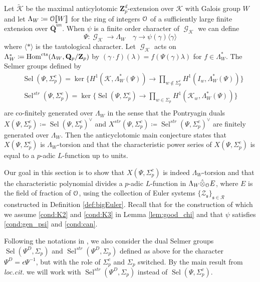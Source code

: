 \documentclass[leqno]{amsart}
\theoremstyle{definition}
\theoremstyle{remark}
\newcommand{\eo}{\EuScript{O}}
\newcommand{\Q}{{\mathbf{Q}}}
\newcommand{\Z}{{\mathbf{Z}}}
\newcommand{\Qp}{\mathbf{Q}_p}
\newcommand{\Zp}{\mathbf{Z}_p}
\DeclareMathOperator{\Hom}{Hom}
\DeclareMathOperator{\Gal}{\mathcal{G}}
\newcommand{\cts}{\textnormal{cts}}
\newcommand{\fs}{\mathfrak{s}}
\newcommand{\K}{{\mathcal{K}}} %
\DeclareMathOperator{\Sel}{Sel}
\begin{document}
Let $\tilde{\K}$ be the maximal anticylotomic $\Z_p^d$-extension
over $\K$ with Galois group $W$ 
and let $\Lambda_W\coloneqq\eo\llbracket W\rrbracket$
for the ring of integers $\eo$ of a sufficiently large
finite extension over $\bar{\Q}^{un}$.
When $\psi$ is a finite order character of $\Gal_\K$ we can define
\[
\Psi\colon \Gal_\K\to \Lambda_W\quad \gamma\to \psi(\gamma)
\langle \gamma\rangle
\]
where $\langle*\rangle$ is the tautological character.
Let $\Gal_\K$ acts on $\Lambda_W^*\coloneqq
\Hom^{\cts}(\Lambda_W,\Qp/\Zp)$ by
$(\gamma\cdot f)(\lambda)=f(\Psi(\gamma)\lambda)$
for $f\in \Lambda_W^*$.
The Selmer groups defined by
\begin{equation}\label{def:Selmers}
\begin{aligned}
    &\Sel(\Psi,\Sigma_p^c)=
    \ker\big\{
    H^1(\K,\Lambda_W^*(\Psi))\to 
    \prod_{w\notin \Sigma_p^c}
    H^1(I_w,\Lambda_W^*(\Psi))
    \big\}\\
    &\Sel^{str}(\Psi,\Sigma_p^c)=
    \ker\big\{
    \Sel(\Psi,\Sigma_p^c)\to
    \prod_{w\in \Sigma_p}
    H^1(\K_w,\Lambda_W^*(\Psi))
    \big\}\\
\end{aligned}
\end{equation}
are co-finitely generated over $\Lambda_W$
in the sense that the Pontryagin duals 
$X(\Psi,\Sigma_p^c)\coloneqq  \Sel(\Psi,\Sigma_p^c)^\vee$ and
$X^{str}(\Psi,\Sigma_p^c)\coloneqq  \Sel^{str}(\Psi,\Sigma_p^c)^\vee$ 
are finitely generated over $\Lambda_W$.
Then the anticyclotomic main conjecture
states that $X(\Psi,\Sigma^c_p)$ is $\Lambda_W$-torsion and
that the characteristic power series
of $X(\Psi,\Sigma^c_p)$ 
is equal to a $p$-adic $L$-function up to units.

Our goal in this section is to show that 
$X(\Psi,\Sigma_p^c)$ is indeed $\Lambda_W$-torsion
and that the characteristic polynomial divides
a $p$-adic $L$-function in 
$\Lambda_W\hat{\otimes}_\eo E$,
where $E$ is the field of fraction of $\eo$,
using the collection of Euler systems 
$\{\mathcal{Z}_\fs\}_{\fs\in\mathcal{R}}$
constructed in Definition \ref{def:bigEuler}.
Recall that for the construction of which 
we assume  \ref{cond:K2} and \ref{cond:K3}
in Lemma \ref{lem:good_chi}
and that $\psi$ satisfies \eqref{cond:gen_psi}
and \eqref{cond:can}.


Following the notations in \cite{Hsieh2010},
we also consider the dual Selmer groups 
$\Sel(\Psi^D,\Sigma_p)$ and
$\Sel^{str}(\Psi^D,\Sigma_p)$ defined as above
for the character $\Psi^D=\epsilon\Psi^{-1}$,
but with the role of $\Sigma_p^c$ and $\Sigma_p$ switched.
By the main result from \textit{loc.cit.}
we will work with $\Sel^{str}(\Psi^D,\Sigma_p)$
instead of $\Sel(\Psi,\Sigma_p^c)$.
\end{document}
